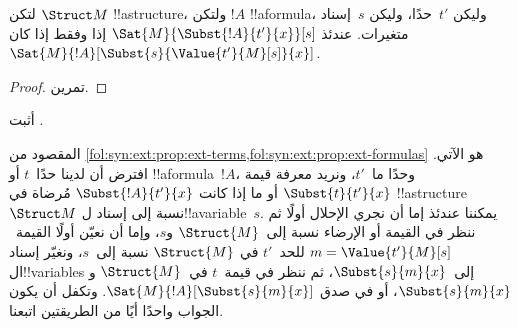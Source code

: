 \documentclass[../../../include/open-logic-section]{subfiles}
\begin{document}
\begin{prop} لتكن $\Struct M$
!!a{structure}، ولتكن $!A$ !!a{formula}، وليكن $t'$~حدًا، وليكن
$s$~إسناد متغيرات. عندئذ
$\Sat{M}{\Subst{!A}{t'}{x}}[s]$ إذا وفقط إذا كان
$\Sat{M}{!A}[\Subst{s}{\Value{t'}{M}[s]}{x}]$.
\end{prop}

\begin{proof}
تمرين.
\end{proof}

\begin{prob}
أثبت .
\end{prob}

\begin{explain}
  المقصود من
  \cref{fol:syn:ext:prop:ext-terms,fol:syn:ext:prop:ext-formulas} هو
  الآتي. افترض أن لدينا حدًا~$t$ أو !!a{formula}~$!A$، وحدًا
  ما~$t'$، ونريد معرفة قيمة $\Subst{t}{t'}{x}$ أو ما إذا كانت
  $\Subst{!A}{t'}{x}$ مُرضاة في !!a{structure}~$\Struct M$ نسبة
  إلى إسناد ل!!a{variable}~$s$. يمكننا عندئذ إما أن نجري الإحلال
  أولًا ثم ننظر في القيمة أو الإرضاء نسبة إلى~$\Struct{M}$ و$s$،
  وإما أن نعيّن أولًا القيمة~$m = \Value{t'}{M}[s]$ للحد~$t'$ في
  $\Struct{M}$ نسبة إلى~$s$، ونغيّر إسناد ال!!{variable}s
  إلى~$\Subst{s}{m}{x}$، ثم ننظر في قيمة~$t$ في~$\Struct{M}$
  و$\Subst{s}{m}{x}$، أو في صدق
  $\Sat{M}{!A}[\Subst{s}{m}{x}]$.
  وتكفل 
  أن يكون الجواب واحدًا أيًا من الطريقتين اتبعنا.
\end{explain}
\end{document}
